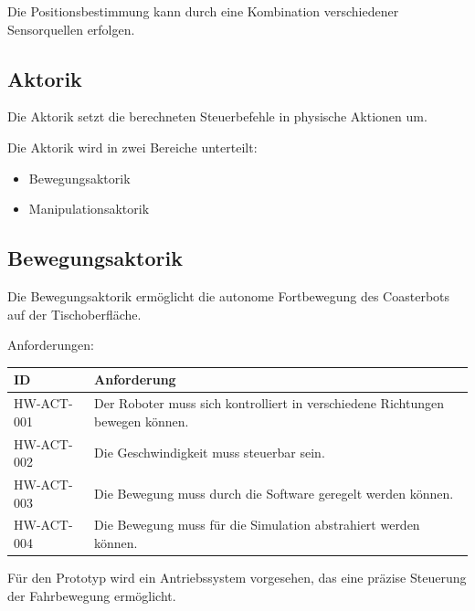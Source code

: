 \documentclass[
  a4paper,
  12pt,
  DIV=12,        %
  parskip=half,  %
  headings=small %
]{scrartcl}
\theoremstyle{definition}
\providecommand{\tightlist}{%
  \setlength{\itemsep}{0pt}\setlength{\parskip}{0pt}}
\theoremstyle{definition}
\begin{document}
Die Positionsbestimmung kann durch eine Kombination verschiedener
Sensorquellen erfolgen.

\subsection{Aktorik}\label{aktorik}

Die Aktorik setzt die berechneten Steuerbefehle in physische Aktionen
um.

Die Aktorik wird in zwei Bereiche unterteilt:

\begin{itemize}
\tightlist
\item
  Bewegungsaktorik
\item
  Manipulationsaktorik
\end{itemize}

\subsection{Bewegungsaktorik}\label{bewegungsaktorik}

Die Bewegungsaktorik ermöglicht die autonome Fortbewegung des
Coasterbots auf der Tischoberfläche.

Anforderungen:

\begin{longtable}[]{@{}
  >{\raggedright\arraybackslash}p{}
  >{\raggedright\arraybackslash}p{}@{}}
\toprule\noalign{}
\begin{minipage}[b]{\linewidth}\raggedright
ID
\end{minipage} & \begin{minipage}[b]{\linewidth}\raggedright
Anforderung
\end{minipage} \\
\midrule\noalign{}
\endhead
\bottomrule\noalign{}
\endlastfoot
HW-ACT-001 & Der Roboter muss sich kontrolliert in verschiedene
Richtungen bewegen können. \\
HW-ACT-002 & Die Geschwindigkeit muss steuerbar sein. \\
HW-ACT-003 & Die Bewegung muss durch die Software geregelt werden
können. \\
HW-ACT-004 & Die Bewegung muss für die Simulation abstrahiert werden
können. \\
\end{longtable}

Für den Prototyp wird ein Antriebssystem vorgesehen, das eine präzise
Steuerung der Fahrbewegung ermöglicht.
\end{document}
